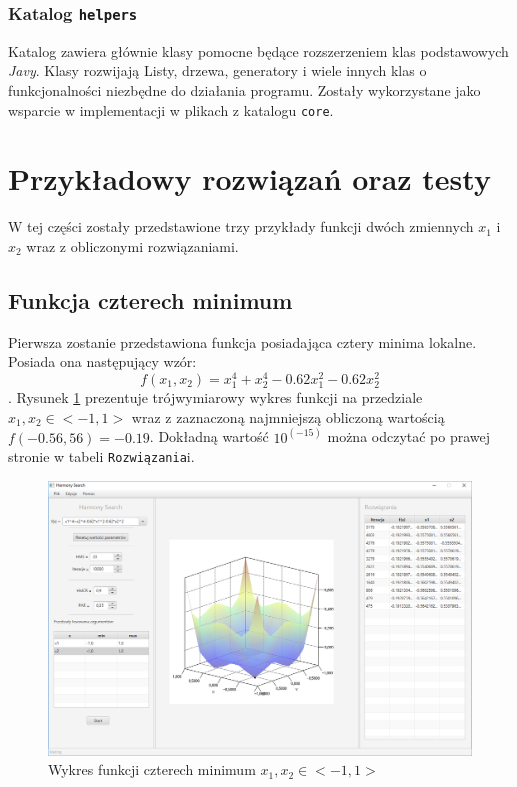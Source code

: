 \documentclass[10pt, a4paper]{article}
\begin{document}
\subsubsection{Katalog {\tt helpers}}
\label{subsubsec:helpers}
Katalog zawiera głównie klasy pomocne będące rozszerzeniem klas podstawowych {\em Javy}. Klasy rozwijają Listy, drzewa, generatory i wiele innych klas o funkcjonalności niezbędne do działania programu. Zostały wykorzystane jako wsparcie w implementacji w plikach z katalogu {\tt core}.

\section{Przykładowy rozwiązań oraz testy}
\label{sec:przyklady}
W tej części zostały przedstawione trzy przykłady funkcji dwóch zmiennych {\em $x_{1}$} i {\em $x_{2}$} wraz z obliczonymi rozwiązaniami.

\subsection{Funkcja czterech minimum}
\label{subsec:fcn4min}
Pierwsza zostanie przedstawiona funkcja posiadająca cztery minima lokalne. Posiada ona następujący wzór: $$f(x_{1},x_{2}) = x_{1}^{4}+x_{2}^{4}-0.62x_{1}^{2}-0.62x_{2}^{2} $$.  Rysunek \ref{fig:11} prezentuje trójwymiarowy wykres funkcji na przedziale $x_{1}, x_{2} \in <-1,1>$ wraz z zaznaczoną najmniejszą obliczoną wartością $f(-0.56,56)=-0.19$. Dokładną wartość $10^(-15)$ można odczytać po prawej stronie w tabeli {\tt Rozwiązania}i. 
\begin{figure}[htbp]
	\centering
		\includegraphics[width=.9\textwidth]{images/11.PNG}
		\caption{Wykres funkcji czterech minimum $x_{1}, x_{2} \in <-1,1>$}
		\label{fig:11}
\end{figure}
\end{document}
